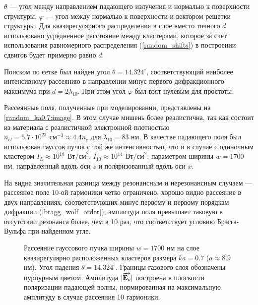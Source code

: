  $\theta$ --- угол между направлением падающего излучения и нормалью к поверхности структуры, $\varphi$ --- угол между нормалью к поверхности и вектором решетки структуры. Для квазирегулярного распределения в слое вместо точного $d$ использовано усредненное расстояние между кластерами, которое за счет использования равномерного распределения (\autoref{random_shifts}) в построении сдвигов будет примерно равно $d$.

Поиском по сетке был найден угол $\theta = 14.324^{\circ}$, соответствующий наиболее интенсивному рассеянию в направлении минус первого дифракционного максимума при $d = 2\lambda_{10}$. При этом угол $\varphi$ был взят нулевым для простоты.

Рассеянные поля, полученные при моделировании, представлены на \autoref{random_ka0.7:image}. В этом случае мишень более реалистична, так как состоит из материала с реалистичной электронной плотностью $n_{el} = 5.7 \cdot 10^{23}\:\,\textrm{см}^{-3} \approx 4.4 n_{c}$ для $\lambda_{10} = 83$ нм. В качестве падающего поля был использован гауссов пучок с той же интенсивностью, что и в случае с одиночным кластером $I_{L} \approx 10^{18}\:\,\textrm{Вт/см}^2$, $I_{10} \approx 10^{14}\:\,\textrm{Вт/см}^2$, параметром ширины $w = 1700$ нм, направленный вдоль оси $z$ и поляризованный вдоль оси $x$.

На  видна значительная разница между резонансным и нерезонансным случаем --- рассеяное поле $10$-ой гармоники четко ограничено, хорошо видно рассеяние в двух направлениях, соответствующих минус первому и первому порядкам дифракции (\autoref{bragg_wolf_order}), амплитуда поля превышает таковую в отсутствии резонанса более, чем в 10 раз, что соответствует условию Брэгга-Вульфа при найденном угле.

    \begin{figure}[htb]
        \hfil
        \caption{Рассеяние гауссового пучка ширины $w = 1700$ нм на слое квазирегулярно расположенных кластеров размера $ka = 0.7$ ($a \approx 8.9$ нм). Угол падения $\theta = 14.324^{\circ}$. Границы газового слоя обозначены пурпурным цветом. Амплитуда $|\overrightarrow{\textbf{E}_{s}}|$ построена в плоскости поляризации падающей волны, нормированная на максимальную амплитуду в случае рассеяния 10 гармоники.}\label{random_ka0.7:image}
    \end{figure}

